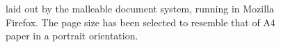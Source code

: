 \begin{figure}
\begin{center}
\vspace{0.2in}
\hspace{0.01\textwidth}
\end{center}
\caption[A sample of document layout]{\cite{Pinkney2011} laid out by the malleable document system, running in Mozilla Firefox. The page size has been selected to resemble that of A4 paper in a portrait orientation.}
\label{fig:example-portrait}
\end{figure}

